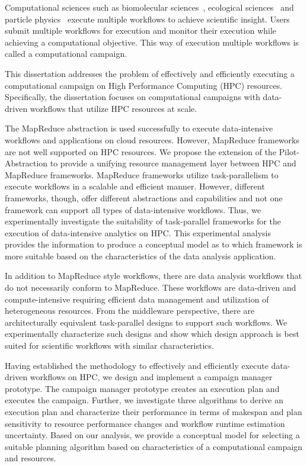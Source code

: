 Computational sciences such as biomolecular sciences~\cite{cheatham2015impact,
dakka2018concurrent}, ecological sciences~\cite{goncalves2020sealnet,
paraskevakos2019workflow} and particle physics~\cite{atlas} execute multiple
workflows to achieve scientific insight. Users submit multiple workflows for
execution and monitor their execution while achieving a computational objective.
This way of execution multiple workflows is called a computational campaign.

This dissertation addresses the problem of effectively and efficiently executing
a computational campaign on High Performance Computing (HPC) resources.
Specifically, the dissertation focuses on computational campaigns with
data-driven workflows that utilize HPC resources at scale.

The MapReduce abstraction is used successfully to execute data-intensive
workflows and applications on cloud resources. However, MapReduce frameworks
are not well supported on HPC resources. We propose the extension of the
Pilot-Abstraction to provide a unifying resource management layer between HPC
and MapReduce frameworks. MapReduce frameworks utilize task-parallelism to
execute workflows in a scalable and efficient manner. However, different
frameworks, though, offer different abstractions and capabilities and not one
framework can support all types of data-intensive workflows. Thus, we
experimentally investigate the suitability of task-parallel frameworks for the
execution of data-intensive analytics on HPC. This experimental analysis
provides the information to produce a conceptual model as to which framework is
more suitable based on the characteristics of the data analysis application.

In addition to MapReduce style workflows, there are data analysis workflows
that do not necessarily conform to MapReduce. These workflows are data-driven
and compute-intensive requiring efficient data management and utilization of
heterogeneous resources. From the middleware perspective, there are
architecturally equivalent task-parallel designs to support such workflows. We
experimentally characterize such designs and show which design approach is best
suited for scientific workflows with similar characteristics.

Having established the methodology to effectively and efficiently execute
data-driven workflows on HPC, we design and implement a campaign manager
prototype. The campaign manager prototype creates an execution plan and
executes the campaign. Further, we investigate three algorithms to derive an
execution plan and characterize their performance in terms of makespan and
plan sensitivity to resource performance changes and workflow runtime
estimation uncertainty. Based on our analysis, we provide a conceptual model
for selecting a suitable planning algorithm based on characteristics of a
computational campaign and resources.

